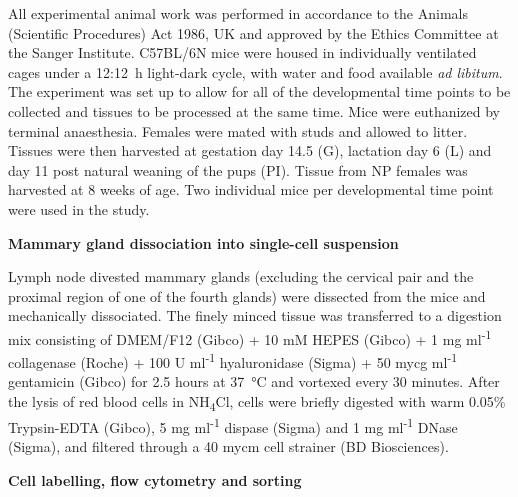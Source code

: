 \documentclass[titlepage, 12pt, oneside]{amsart}
\begin{document}
All experimental animal work was performed in accordance to the Animals (Scientific Procedures) Act 1986, UK and approved by the Ethics Committee at the Sanger Institute.
C57BL/6N mice were housed in individually ventilated cages under a 12:12~h light-dark cycle, with water and food available \textit{ad libitum}.
The experiment was set up to allow for all of the developmental time points to be collected and tissues to be processed at the same time.
Mice were euthanized by terminal anaesthesia.
Females were mated with studs and allowed to litter.
Tissues were then harvested at gestation day 14.5 (G), lactation day 6 (L) and day 11 post natural weaning of the pups (PI).
Tissue from NP females was harvested at 8 weeks of age.
Two individual mice per developmental time point were used in the study.

\textbf{Mammary gland dissociation into single-cell suspension}

Lymph node divested mammary glands (excluding the cervical pair and the proximal region of one of the fourth glands) were dissected from the mice and mechanically dissociated.
The finely minced tissue was transferred to a digestion mix consisting of DMEM/F12 (Gibco) + 10 mM HEPES (Gibco) + 1 mg ml\textsuperscript{-1} collagenase (Roche) + 100 U ml\textsuperscript{-1} hyaluronidase (Sigma) + 50 mycg ml\textsuperscript{-1} gentamicin (Gibco) for 2.5 hours at \SI{37}{\celsius} and vortexed every 30 minutes.
After the lysis of red blood cells in NH\textsubscript{4}Cl, cells were briefly digested with warm 0.05\% Trypsin-EDTA (Gibco), 5 mg ml\textsuperscript{-1} dispase (Sigma) and 1 mg ml\textsuperscript{-1} DNase (Sigma), and filtered through a 40 mycm cell strainer (BD Biosciences).

\textbf{Cell labelling, flow cytometry and sorting}
\end{document}
